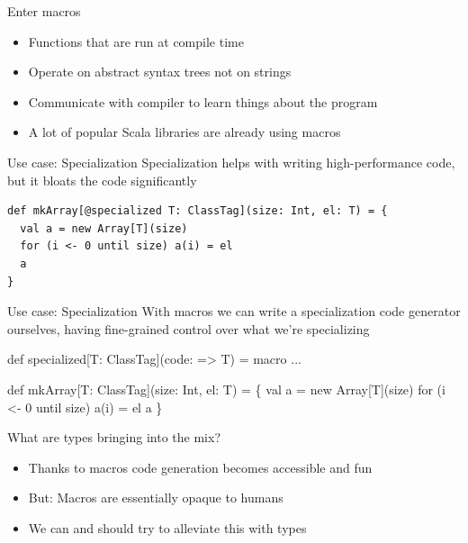 \documentclass{beamer}
\begin{document}

\begin{frame}{Enter macros}
  \begin{itemize}
    \item Functions that are run at compile time
    \item Operate on abstract syntax trees not on strings
    \item Communicate with compiler to learn things about the program
    \item A lot of popular Scala libraries are already using macros
  \end{itemize}
\end{frame}

\begin{frame}[fragile]{Use case: Specialization}
  Specialization helps with writing high-performance code,
  but it bloats the code significantly

  \vspace{1em}
  \begin{verbatim}
def mkArray[@specialized T: ClassTag](size: Int, el: T) = {
  val a = new Array[T](size)
  for (i <- 0 until size) a(i) = el
  a
}
  \end{verbatim}
\end{frame}

\begin{frame}[fragile]{Use case: Specialization}
  With macros we can write a specialization code generator ourselves,
  having fine-grained control over what we're specializing

  \vspace{1em}
  \begin{semiverbatim}
def specialized[T: ClassTag](code: => T) = macro ...

def mkArray[T: ClassTag](size: Int, el: T) = \{
  val a = new Array[T](size)
    for (i <- 0 until size) a(i) = el
  \text{\color{blue}{\}}}
  a
\}
  \end{semiverbatim}
\end{frame}

\begin{frame}{What are types bringing into the mix?}
  \begin{itemize}
    \item Thanks to macros code generation becomes accessible and fun
    \item But: Macros are essentially opaque to humans
    \item We can and should try to alleviate this with types
  \end{itemize}
\end{frame}
\end{document}
